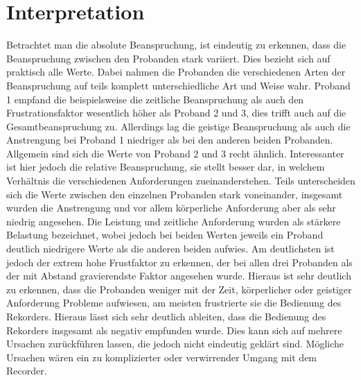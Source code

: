\section{Interpretation}

Betrachtet man die absolute Beanspruchung, ist eindeutig zu erkennen, dass die Beanspruchung zwischen den Probanden stark variiert. Dies bezieht sich auf praktisch alle Werte. Dabei nahmen die Probanden die verschiedenen Arten der Beanspruchung auf teils komplett unterschiedliche Art und Weise wahr. Proband 1 empfand die beispielsweise die zeitliche Beanspruchung als auch den Frustrationsfaktor wesentlich höher als Proband 2 und 3, dies trifft auch auf die Gesamtbeanspruchung zu. Allerdings lag die geistige Beanspruchung als auch die Anstrengung bei Proband 1 niedriger als bei den anderen beiden Probanden. Allgemein sind sich die Werte von Proband 2 und 3 recht ähnlich.
Interessanter ist hier jedoch die relative Beanspruchung, sie stellt besser dar, in welchem Verhältnis die verschiedenen Anforderungen zueinanderstehen. Teils unterscheiden sich die Werte zwischen den einzelnen Probanden stark voneinander, insgesamt wurden die Anstrengung und vor allem körperliche Anforderung aber als sehr niedrig angesehen. Die Leistung und zeitliche Anforderung wurden als stärkere Belastung bezeichnet, wobei jedoch bei beiden Werten jeweils ein Proband deutlich niedrigere Werte als die anderen beiden aufwies. Am deutlichsten ist jedoch der extrem hohe Frustfaktor zu erkennen, der bei allen drei Probanden als der mit Abstand gravierendste Faktor angesehen wurde. Hieraus ist sehr deutlich zu erkennen, dass die Probanden weniger mit der Zeit, körperlicher oder geistiger Anforderung Probleme aufwiesen, am meisten frustrierte sie die Bedienung des Rekorders. Hieraus lässt sich sehr deutlich ableiten, dass die Bedienung des Rekorders insgesamt als negativ empfunden wurde. Dies kann sich auf mehrere Ursachen zurückführen lassen, die jedoch nicht eindeutig geklärt sind. Mögliche Ursachen wären ein zu komplizierter oder verwirrender Umgang mit dem Recorder.
